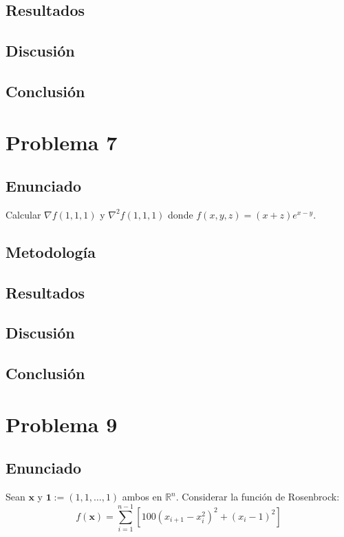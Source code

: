 \documentclass{article}
\begin{document}
\subsection{Resultados}
\setcounter{equation}{0}

\subsection{Discusión}

\subsection{Conclusión}

\section{Problema 7}

\subsection{Enunciado}
Calcular $\nabla f(1, 1, 1)$ y $\nabla^2 f(1, 1, 1)$ donde $f(x, y, z) = (x + z)e^{x-y}$.

\subsection{Metodología}

\subsection{Resultados}
\setcounter{equation}{0}

\subsection{Discusión}

\subsection{Conclusión}

\section{Problema 9}

\subsection{Enunciado}
Sean $\mathbf{x}$ y $\mathbf{1} := (1, 1, \ldots, 1)$ ambos en $\mathbb{R}^n$. Considerar la función de Rosenbrock:
$$f(\mathbf{x}) = \sum_{i=1}^{n-1} \left[100(x_{i+1} - x_i^2)^2 + (x_i - 1)^2\right]$$
\end{document}
